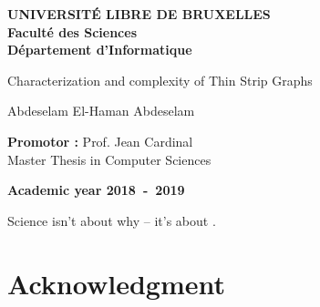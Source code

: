 \documentclass[12pt,a4paper,oneside]{book}
\let\emph\relax %
\theoremstyle{definition}
\theoremstyle{remark}
\theoremstyle{plain}
\numberwithin{theorem}{section}
\begin{document}
\frontmatter
\begin{titlepage}
\begin{center}
\textbf{UNIVERSIT\'E LIBRE DE BRUXELLES}\\
\textbf{Facult\'e des Sciences}\\
\textbf{D\'epartement d'Informatique}
\vfill{}\vfill{}

{\Huge  Characterization and complexity of \vspace*{.5cm} \linebreak[4] Thin Strip Graphs}


{\Huge \par}
\begin{center}{\LARGE Abdeselam El-Haman Abdeselam}\end{center}{\Huge \par}
\vfill{}\vfill{}
\begin{flushright}{\large \textbf{Promotor :} Prof. Jean Cardinal}\\\hfill{}{\large Master Thesis in Computer Sciences}\\
{\large }\hfill{}{}\end{flushright}{\large\par}
\vfill{}\vfill{}\enlargethispage{3cm}
\textbf{Academic year 2018~-~2019}
\end{center}
\end{titlepage}
\newpage
\thispagestyle{empty}
\null

\newenvironment{vcenterpage}
{\newpage\thispagestyle{empty}
\vspace*{\fill}}
{\vspace*{\fill}\par\pagebreak}

\newpage
\thispagestyle{empty}
\vspace*{5cm}

\begin{fquote}
  Science isn't about why -- it's about \emph{why not}.
\end{fquote}


\chapter*{Acknowledgment}
\thispagestyle{empty}
\end{document}
